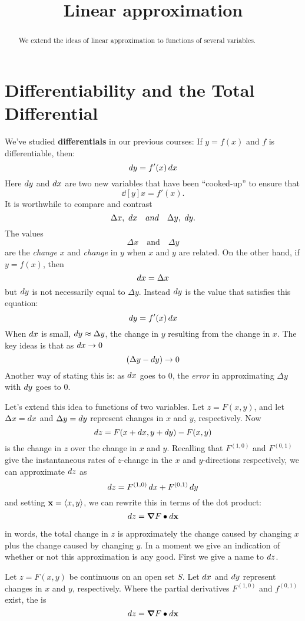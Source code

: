 \documentclass{ximera}
\title[Dig-In:]{Linear approximation}
\begin{document}
\begin{abstract}
  We extend the ideas of linear approximation to functions of several
  variables.
\end{abstract}
\maketitle

\section{Differentiability and the Total Differential}\label{sec:total_differential}

We've studied \textbf{differentials} in our previous courses: If
$y=f(x)$ and $f$ is differentiable, then:
\[
\mathop{}\!d y=f'(x)\mathop{}\!d x
\]
Here $\mathop{}\!d y$ and $\mathop{}\!d x$ are two new variables that have been
``cooked-up'' to ensure that
\[
\dd[y]{x} = f'(x).
\]
It is worthwhile to compare and contrast
\[
\Delta x, \ \mathop{}\!d x \quad{and}\quad \Delta y,\  \mathop{}\!d y.
\]
The values
\[
\Delta x \quad\text{and}\quad \Delta y
\]
are the \textit{change} $x$ and \textit{change} in $y$ when $x$ and
$y$ are related. On the other hand, if $y=f(x)$, then
\[
\mathop{}\!d x = \Delta x
\]
but $\mathop{}\!d y$ is not necessarily equal to $\Delta y$. Instead $\mathop{}\!d y$ is
the value that satisfies this equation:
\[
\mathop{}\!d y=f'(x)\mathop{}\!d x
\]
When $\mathop{}\!d x$ is small, $\mathop{}\!d y\approx \Delta y$, the change in $y$
resulting from the change in $x$. The key ideas is that as $\mathop{}\!d x\to 0$
\[
(\Delta y - \mathop{}\!d y) \to 0
\]
Another way of stating this is: as $\mathop{}\!d x$ goes to $0$, the \textit{error}
in approximating $\Delta y$ with $\mathop{}\!d y$ goes to $0$.


Let's extend this idea to functions of two variables. Let $z=F(x,y)$,
and let $\Delta x = \mathop{}\!d x$ and $\Delta y=\mathop{}\!d y$ represent changes in $x$
and $y$, respectively. Now
\[
\mathop{}\!d z = F(x+\mathop{}\!d x,y+\mathop{}\!d y) - F(x,y)
\]
is the change in $z$ over the change in $x$ and $y$. Recalling that
$F^{(1,0)}$ and $F^{(0,1)}$ give the instantaneous rates of $z$-change
in the $x$ and $y$-directions respectively, we can approximate $\mathop{}\!d z$ as
\[
\mathop{}\!d z = F^{(1,0)}\mathop{}\!d x+F^{(0,1)}\mathop{}\!d y
\]
and setting $\mathbf{x}=\left\langle x,y\right\rangle$, we can rewrite this in terms of
the dot product:
\[
\mathop{}\!d z = \boldsymbol\nabla F \bullet \mathop{}\!d \mathbf{x}
\]

in words, the total change in $z$ is approximately the
change caused by changing $x$ plus the change caused by changing
$y$. In a moment we give an indication of whether or not this
approximation is any good. First we give a name to $\mathop{}\!d z$.

\begin{definition}
Let $z=F(x,y)$ be continuous on an open set $S$. Let $\mathop{}\!d x$ and $\mathop{}\!d y$
represent changes in $x$ and $y$, respectively. Where the partial
derivatives $F^{(1,0)}$ and $f^{(0,1)}$ exist, the  is
\[
\mathop{}\!d z  = \boldsymbol\nabla F \bullet \mathop{}\!d \mathbf{x}
\]
\end{definition}
\end{document}
